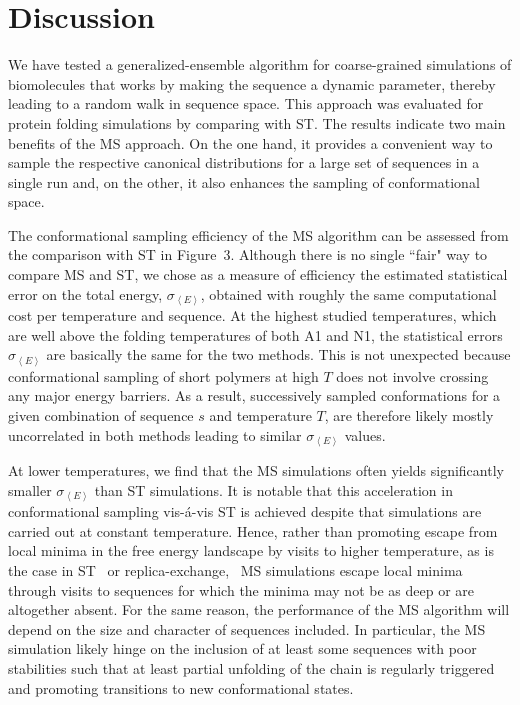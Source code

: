 \documentclass[
aip,
rsi,%
amsmath,amssymb,
reprint,%
]{revtex4-1}
\newcommand	 {\sbar}	{{s}}
\newcommand {\sigE}	{{\sigma_{\left < E \right >}}}
\begin{document}
\section{Discussion}
\noindent
We have tested a generalized-ensemble algorithm for coarse-grained simulations of biomolecules that works by making the sequence a dynamic parameter, thereby leading to a random walk in sequence space. This approach was evaluated for protein folding simulations by comparing with ST. The results indicate two main benefits of the MS approach. On the one hand, it provides a convenient way to sample the respective canonical distributions for a large set of sequences in a single run and, on the other, it also enhances the sampling of conformational space. 

The conformational sampling efficiency of the MS algorithm can be assessed from the comparison with ST in Figure~3. Although there is no single ``fair" way to compare MS and ST, we chose as a measure of efficiency the estimated statistical error on the total energy, $\sigE$, obtained with roughly the same computational cost per temperature and sequence. At the highest studied temperatures, which are well above the folding temperatures of both A1 and N1, the statistical errors $\sigE$ are basically the same for the two methods. This is not unexpected because conformational sampling of short polymers at high $T$ does not involve crossing any major energy barriers. As a result, successively sampled conformations for a given combination of sequence $\sbar$ and temperature $T$, are therefore likely mostly uncorrelated in both methods leading to similar $\sigE$ values. 

At lower temperatures, we find that the MS simulations often yields significantly smaller $\sigE$ than ST simulations. It is notable that this acceleration in conformational sampling vis-{\'a}-vis ST is achieved despite that simulations are carried out at constant temperature. Hence, rather than promoting escape from local minima in the free energy landscape by visits to higher temperature, as is the case in  ST~\cite{Marinari1992,Lyubartsev1992} or replica-exchange,~\cite{Swendsen1986}  MS simulations escape local minima through visits to sequences for which the minima may not be as deep or are altogether absent. For the same reason, the performance of the MS algorithm will depend on the size and character of sequences included. In particular, the MS simulation likely hinge on the inclusion of at least some sequences with poor stabilities such that at least partial unfolding of the chain is regularly triggered and promoting transitions to new conformational states. 
\end{document}
